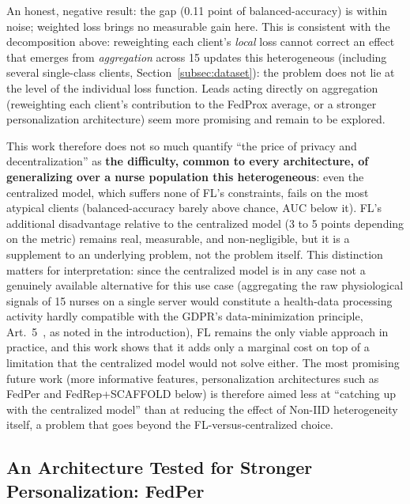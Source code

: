 \documentclass{article}
\begin{document}
An honest, negative result: the gap (0.11 point of balanced-accuracy) is within
noise; weighted loss brings no measurable gain here. This is consistent with the
decomposition above: reweighting each client's \emph{local} loss cannot correct
an effect that emerges from \emph{aggregation} across 15 updates this
heterogeneous (including several single-class clients,
Section~\ref{subsec:dataset}): the problem does not lie at the level of the
individual loss function. Leads acting directly on aggregation (reweighting each
client's contribution to the FedProx average, or a stronger personalization
architecture) seem more promising and remain to be explored.

This work therefore does not so much quantify ``the price of privacy and
decentralization'' as \textbf{the difficulty, common to every architecture, of
generalizing over a nurse population this heterogeneous}: even the centralized
model, which suffers none of FL's constraints, fails on the most atypical
clients (balanced-accuracy barely above chance, AUC below it). FL's additional
disadvantage relative to the centralized model (3 to 5 points depending on the
metric) remains real, measurable, and non-negligible, but it is a supplement to
an underlying problem, not the problem itself. This distinction matters for
interpretation: since the centralized model is in any case not a genuinely
available alternative for this use case (aggregating the raw physiological
signals of 15 nurses on a single server would constitute a health-data
processing activity hardly compatible with the GDPR's data-minimization
principle, Art.~5~\cite{gdpr2016}, as noted in the introduction), FL remains the
only viable approach in practice, and this work shows that it adds only a
marginal cost on top of a limitation that the centralized model would not solve
either. The most promising future work (more informative features,
personalization architectures such as FedPer and FedRep+SCAFFOLD below) is
therefore aimed less at ``catching up with the centralized model'' than at
reducing the effect of Non-IID heterogeneity itself, a problem that goes beyond
the FL-versus-centralized choice.

\subsection{An Architecture Tested for Stronger Personalization: FedPer}
\label{subsec:fedper}
\end{document}
